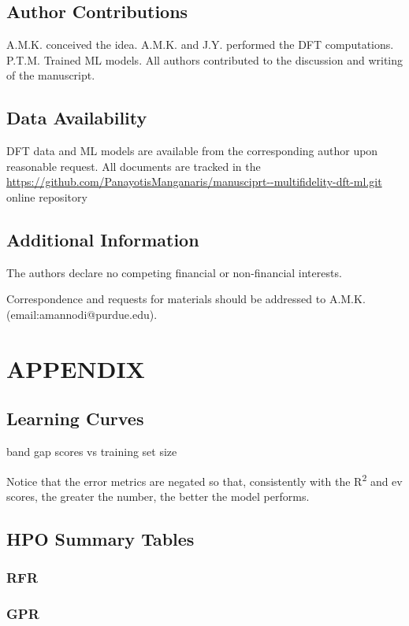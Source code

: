 \documentclass[aip, jmp, amsmath, amssymb]{revtex4-2}
\begin{document}
\subsection*{Author Contributions}
\label{sec:org297d648}
A.M.K. conceived the idea. A.M.K. and J.Y. performed the DFT
computations. P.T.M. Trained ML models. All authors contributed to the
discussion and writing of the manuscript.

\subsection*{Data Availability}
\label{sec:org2602a12}
DFT data and ML models are available from the corresponding author
upon reasonable request. All documents are tracked in the
\url{https://github.com/PanayotisManganaris/manusciprt--multifidelity-dft-ml.git}
online repository

\subsection*{Additional Information}
\label{sec:orgc75024b}
The authors declare no competing financial or non-financial interests.

Correspondence and requests for materials should be addressed to A.M.K.
(email:amannodi@purdue.edu).

\section*{}
\label{sec:org9b36056}



\section*{APPENDIX}
\label{sec:org9a4ad7b}
\subsection*{Learning Curves}
\label{sec:orga48529c}
band gap scores vs training set size

Notice that the error metrics are negated so that, consistently with
the R\textsuperscript{2} and ev scores, the greater the number, the better the model
performs.


\subsection*{HPO Summary Tables}
\label{sec:org22f6d9a}
\subsubsection*{RFR}
\label{sec:org643e74b}
\subsubsection*{GPR}
\label{sec:org6d7c9c8}
\end{document}
